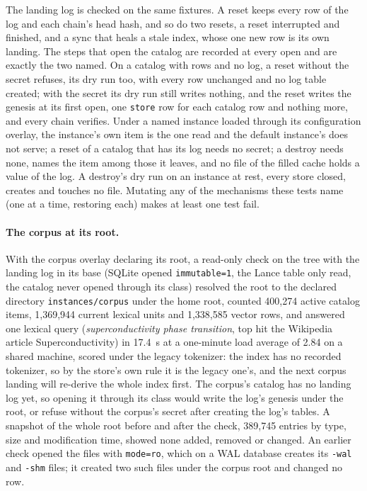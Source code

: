 \documentclass[11pt]{article}
\theoremstyle{plain}
\theoremstyle{definition}
\theoremstyle{remark}
\newcommand{\code}[1]{\texttt{#1}}
\newcommand{\corpusitems}{400{,}274}
\newcommand{\corpusunits}{1{,}369{,}944}
\newcommand{\corpusrows}{1{,}338{,}585}
\newcommand{\corpusentries}{389{,}745}
\newcommand{\lexsec}{17.4}
\newcommand{\lexload}{2.84}
\begin{document}
The landing log is checked on the same fixtures. A reset keeps every row of the log and each
chain's head hash, and so do two resets, a reset interrupted and finished, and a sync that heals a
stale index, whose one new row is its own landing. The steps that open the catalog are recorded at
every open and are exactly the two named. On a catalog with rows and no log, a reset without the
secret refuses, its dry run too, with every row unchanged and no log table created; with the
secret its dry run still writes nothing, and the reset writes the genesis at its first open, one
\code{store} row for each catalog row and nothing more, and every chain verifies. Under a named instance loaded through its configuration
overlay, the instance's own item is the one read and the default instance's does not serve; a
reset of a catalog that has its log needs no secret; a destroy needs none, names the item among
those it leaves, and no file of the filled cache holds a value of the log. A destroy's dry run on
an instance at rest, every store closed, creates and touches no file. Mutating any of the
mechanisms these tests name (one at a time, restoring each) makes at least one test fail.

\paragraph{The corpus at its root.} With the corpus overlay declaring its root, a read-only check
on the tree with the landing log in its base (SQLite opened \code{immutable=1}, the Lance table
only read, the catalog never opened through its class) resolved the root to the declared
directory \code{instances/corpus} under the home root, counted \corpusitems{} active catalog items,
\corpusunits{} current lexical units and \corpusrows{} vector rows, and answered one lexical query
(\emph{superconductivity phase transition}, top hit the Wikipedia article Superconductivity) in
\lexsec{}~s at a one-minute load average of \lexload{} on a shared machine, scored under the legacy
tokenizer: the index has no recorded tokenizer, so by the store's own rule it is the legacy one's,
and the next corpus landing will re-derive the whole index first. The corpus's catalog has no
landing log yet, so opening it through its class would write the log's genesis under the root, or
refuse without the corpus's secret after creating the log's tables. A snapshot of the whole root
before and after the check, \corpusentries{} entries by type, size and modification time, showed
none added, removed or changed. An earlier check opened the files with \code{mode=ro}, which on a
WAL database creates its \code{-wal} and \code{-shm} files; it created two such files under the
corpus root and changed no row.
\end{document}
